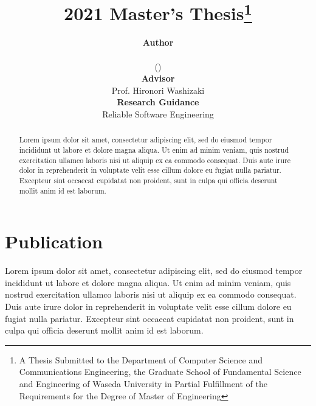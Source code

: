 \documentclass[a4paper,titlepage]{article}
\title{\textbf{2021 Master's Thesis}\thanks{A Thesis Submitted to the Department of Computer Science and Communications Engineering, the Graduate School of Fundamental Science and Engineering of Waseda University in Partial Fulfillment of the Requirements for the Degree of Master of Engineering}\\\yourtitle}
\author{\textbf{Author}\\\yourname\\(\yourstudentid)\bigskip\\\textbf{Advisor}\\Prof. Hironori Washizaki\bigskip\\\textbf{Research Guidance}\\Reliable Software Engineering}
\date{\yourdate}
\begin{document}
\maketitle

\begin{abstract}
Lorem ipsum dolor sit amet, consectetur adipiscing elit, sed do eiusmod tempor incididunt ut labore et dolore magna aliqua.
Ut enim ad minim veniam, quis nostrud exercitation ullamco laboris nisi ut aliquip ex ea commodo consequat.
Duis aute irure dolor in reprehenderit in voluptate velit esse cillum dolore eu fugiat nulla pariatur.
Excepteur sint occaecat cupidatat non proident, sunt in culpa qui officia deserunt mollit anim id est laborum.
\end{abstract} 

\tableofcontents
\listoffigures
\listoftables
\newpage


\newpage


\newpage
\part*{Publication}
Lorem ipsum dolor sit amet, consectetur adipiscing elit, sed do eiusmod tempor incididunt ut labore et dolore magna aliqua.
Ut enim ad minim veniam, quis nostrud exercitation ullamco laboris nisi ut aliquip ex ea commodo consequat.
Duis aute irure dolor in reprehenderit in voluptate velit esse cillum dolore eu fugiat nulla pariatur.
Excepteur sint occaecat cupidatat non proident, sunt in culpa qui officia deserunt mollit anim id est laborum.
\end{document}
